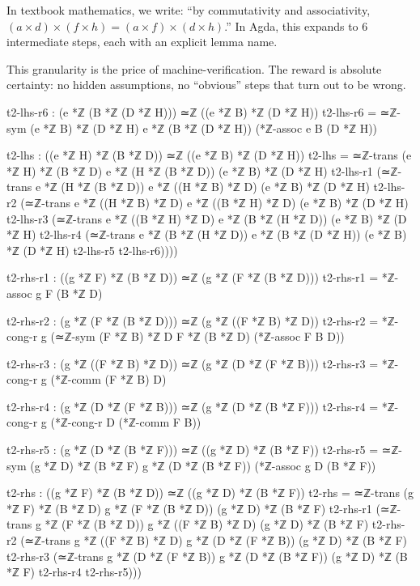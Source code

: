\documentclass[11pt,a4paper]{book}
\begin{document}
In textbook mathematics, we write: ``by commutativity and associativity, $(a \times d) 
\times (f \times h) = (a \times f) \times (d \times h)$.'' In Agda, this expands 
to 6 intermediate steps, each with an explicit lemma name.

This granularity is the price of machine-verification. The reward is absolute certainty: 
no hidden assumptions, no ``obvious'' steps that turn out to be wrong.

\begin{code}
    t2-lhs-r6 : (e *ℤ (B *ℤ (D *ℤ H))) ≃ℤ ((e *ℤ B) *ℤ (D *ℤ H))
    t2-lhs-r6 = ≃ℤ-sym {(e *ℤ B) *ℤ (D *ℤ H)} {e *ℤ (B *ℤ (D *ℤ H))} (*ℤ-assoc e B (D *ℤ H))
    
    t2-lhs : ((e *ℤ H) *ℤ (B *ℤ D)) ≃ℤ ((e *ℤ B) *ℤ (D *ℤ H))
    t2-lhs = ≃ℤ-trans {(e *ℤ H) *ℤ (B *ℤ D)} {e *ℤ (H *ℤ (B *ℤ D))} {(e *ℤ B) *ℤ (D *ℤ H)} t2-lhs-r1
             (≃ℤ-trans {e *ℤ (H *ℤ (B *ℤ D))} {e *ℤ ((H *ℤ B) *ℤ D)} {(e *ℤ B) *ℤ (D *ℤ H)} t2-lhs-r2
             (≃ℤ-trans {e *ℤ ((H *ℤ B) *ℤ D)} {e *ℤ ((B *ℤ H) *ℤ D)} {(e *ℤ B) *ℤ (D *ℤ H)} t2-lhs-r3
             (≃ℤ-trans {e *ℤ ((B *ℤ H) *ℤ D)} {e *ℤ (B *ℤ (H *ℤ D))} {(e *ℤ B) *ℤ (D *ℤ H)} t2-lhs-r4
             (≃ℤ-trans {e *ℤ (B *ℤ (H *ℤ D))} {e *ℤ (B *ℤ (D *ℤ H))} {(e *ℤ B) *ℤ (D *ℤ H)} t2-lhs-r5 t2-lhs-r6))))
    
    t2-rhs-r1 : ((g *ℤ F) *ℤ (B *ℤ D)) ≃ℤ (g *ℤ (F *ℤ (B *ℤ D)))
    t2-rhs-r1 = *ℤ-assoc g F (B *ℤ D)
    
    t2-rhs-r2 : (g *ℤ (F *ℤ (B *ℤ D))) ≃ℤ (g *ℤ ((F *ℤ B) *ℤ D))
    t2-rhs-r2 = *ℤ-cong-r g (≃ℤ-sym {(F *ℤ B) *ℤ D} {F *ℤ (B *ℤ D)} (*ℤ-assoc F B D))
    
    t2-rhs-r3 : (g *ℤ ((F *ℤ B) *ℤ D)) ≃ℤ (g *ℤ (D *ℤ (F *ℤ B)))
    t2-rhs-r3 = *ℤ-cong-r g (*ℤ-comm (F *ℤ B) D)
    
    t2-rhs-r4 : (g *ℤ (D *ℤ (F *ℤ B))) ≃ℤ (g *ℤ (D *ℤ (B *ℤ F)))
    t2-rhs-r4 = *ℤ-cong-r g (*ℤ-cong-r D (*ℤ-comm F B))
    
    t2-rhs-r5 : (g *ℤ (D *ℤ (B *ℤ F))) ≃ℤ ((g *ℤ D) *ℤ (B *ℤ F))
    t2-rhs-r5 = ≃ℤ-sym {(g *ℤ D) *ℤ (B *ℤ F)} {g *ℤ (D *ℤ (B *ℤ F))} (*ℤ-assoc g D (B *ℤ F))
    
    t2-rhs : ((g *ℤ F) *ℤ (B *ℤ D)) ≃ℤ ((g *ℤ D) *ℤ (B *ℤ F))
    t2-rhs = ≃ℤ-trans {(g *ℤ F) *ℤ (B *ℤ D)} {g *ℤ (F *ℤ (B *ℤ D))} {(g *ℤ D) *ℤ (B *ℤ F)} t2-rhs-r1
             (≃ℤ-trans {g *ℤ (F *ℤ (B *ℤ D))} {g *ℤ ((F *ℤ B) *ℤ D)} {(g *ℤ D) *ℤ (B *ℤ F)} t2-rhs-r2
             (≃ℤ-trans {g *ℤ ((F *ℤ B) *ℤ D)} {g *ℤ (D *ℤ (F *ℤ B))} {(g *ℤ D) *ℤ (B *ℤ F)} t2-rhs-r3
             (≃ℤ-trans {g *ℤ (D *ℤ (F *ℤ B))} {g *ℤ (D *ℤ (B *ℤ F))} {(g *ℤ D) *ℤ (B *ℤ F)} t2-rhs-r4 t2-rhs-r5)))


\end{code}
\end{document}
